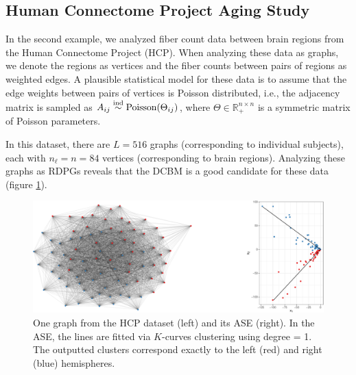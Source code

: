 \documentclass[12pt]{article}
\begin{document}
\hypertarget{human-connectome-project-aging-study}{%
\subsection{Human Connectome Project Aging
Study}\label{human-connectome-project-aging-study}}

In the second example, we analyzed fiber count data between brain
regions from the Human Connectome Project (HCP). When analyzing these
data as graphs, we denote the regions as vertices and the fiber counts
between pairs of regions as weighted edges. A plausible statistical
model for these data is to assume that the edge weights between pairs of
vertices is Poisson distributed, i.e., the adjacency matrix is sampled
as \(A_{ij} \stackrel{\mathrm{ind}}{\sim} \mathrm{Poisson}(\Theta_{ij})\), where
\(\Theta \in \mathbb{R}_+^{n \times n}\) is a symmetric matrix of
Poisson parameters.

In this dataset, there are \(L = 516\) graphs (corresponding to
individual subjects), each with \(n_\ell = n = 84\) vertices
(corresponding to brain regions). Analyzing these graphs as RDPGs
reveals that the DCBM is a good candidate for these data (figure
\ref{fig:hcp-ase}).

\begin{figure}[H]

{\centering \includegraphics[width=1\linewidth]{draft_files/figure-latex/hcp-ase-1} 

}

\caption{One graph from the HCP dataset (left) and its ASE (right). In the ASE, the lines are fitted via $K$-curves clustering using degree = 1. The outputted clusters correspond exactly to the left (red) and right (blue) hemispheres.}\label{fig:hcp-ase}
\end{figure}
\end{document}
